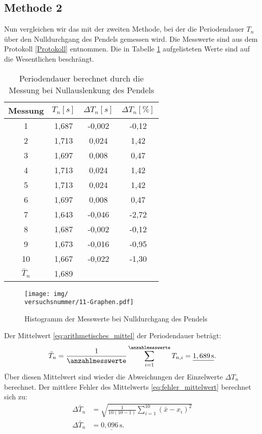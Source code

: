 \subsection*{Methode 2}
Nun vergleichen wir das mit der zweiten Methode, bei der die Periodendauer $T_{n}$ über den Nulldurchgang des Pendels gemessen wird. Die Messwerte sind aus dem Protokoll \ref{Protokoll} entnommen. Die in Tabelle \ref{tab:null_Auslenkung} aufgelisteten Werte sind auf die Wesentlichen beschrängt.
\begin{table}[h!]
\centering

\begin{tabular}{c|c|c|c}
Messung & $T_{n} [s]$ & $\Delta T_{n} [s]$ & $\Delta T_{n} [\%]$ \\
\hline
1 & 1,687 & -0,002 & -0,12 \\
2 & 1,713 & 0,024 & 1,42 \\
3 & 1,697 & 0,008 & 0,47 \\
4 & 1,713 & 0,024 & 1,42 \\
5 & 1,713 & 0,024 & 1,42 \\
6 & 1,697 & 0,008 & 0,47 \\
7 & 1,643 & -0,046 & -2,72 \\
8 & 1,687 & -0,002 & -0,12 \\
9 & 1,673 & -0,016 & -0,95 \\
10 & 1,667 & -0,022 & -1,30 \\
\hline
$\bar{T}_{n}$ & 1,689 & & \\
\end{tabular}
\caption{Periodendauer berechnet durch die Messung bei Nullauslenkung des Pendels}
\label{tab:null_Auslenkung}
\end{table}

\begin{figure}[h!]
    \centering
    \texttt{[image: img/\\versuchsnummer/11-Graphen.pdf]}
    \caption{Histogramm der Messwerte bei Nulldurchgang des Pendels}
    \label{fig:histogramm_null_auslenkung}
\end{figure}


Der Mittelwert \eqref{eq:arithmetisches_mittel} der Periodendauer beträgt:
\begin{equation}
    \bar{T}_{n} = \frac{1}{\anzahlmesswerte}\sum_{i=1}^{\anzahlmesswerte} T_{n,i} = \underline{1,689\,\mathrm{s}}.
\end{equation}
Über diesen Mittelwert sind wieder die Abweichungen der Einzelwerte $\Delta T_{n}$ berechnet.
Der mittlere Fehler des Mittelwerts \eqref{eq:fehler_mittelwert} berechnet sich zu:
\begin{align}
    \Delta \bar{T}_{n} & = \sqrt{\frac{1}{10(10-1)} \sum_{i=1}^{10} (\bar{x}-x_i)^2} \\
    \Delta \bar{T}_{n} & = \underline{0,096\,\mathrm{s}}.
\end{align}

